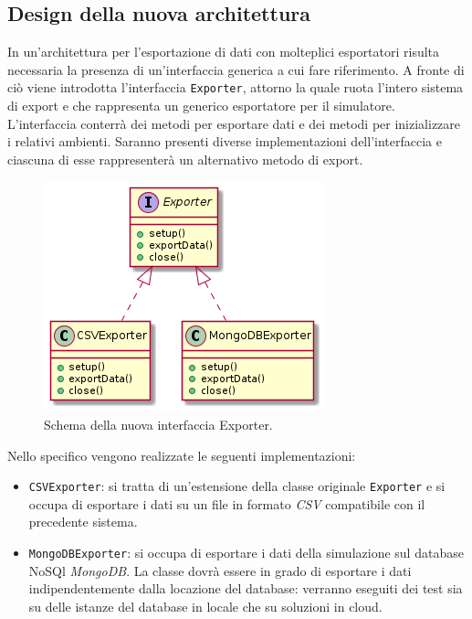 \documentclass[12pt,a4paper,openright,oneside]{book}
\begin{document}
\subsection{Design della nuova architettura}
In un'architettura per l'esportazione di dati con molteplici esportatori risulta necessaria la presenza di un'interfaccia generica a cui fare riferimento. A fronte di ciò viene introdotta l'interfaccia \texttt{Exporter}, attorno la quale ruota l'intero sistema di export e che rappresenta un generico esportatore per il simulatore.
L'interfaccia conterrà dei metodi per esportare dati e dei metodi per inizializzare i relativi ambienti.
Saranno presenti diverse implementazioni dell'interfaccia e ciascuna di esse rappresenterà un alternativo metodo di export.
\begin{figure}
	\centering
	\includegraphics[width=1\linewidth]{images/alchemist-strategy.png}
	\caption{Schema della nuova interfaccia Exporter.}
	\label{fig:uml-alchemist-strategy}
\end{figure}
Nello specifico vengono realizzate le seguenti implementazioni:
\begin{itemize}
    \item \texttt{CSVExporter}: si tratta di un'estensione della classe originale \texttt{Exporter} e si occupa di esportare i dati su un file in formato \textit{CSV} compatibile con il precedente sistema.
    \item \texttt{MongoDBExporter}: si occupa di esportare i dati della simulazione sul database NoSQl \textit{MongoDB}. La classe dovrà essere in grado di esportare i dati indipendentemente dalla locazione del database: verranno eseguiti dei test sia su delle istanze del database in locale che su soluzioni in cloud.
\end{itemize}
\end{document}
